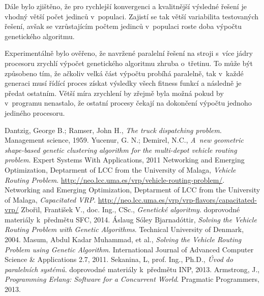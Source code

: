 \documentclass[a4paper]{article}
\begin{document}
Dále bylo zjištěno, že pro rychlejší konvergenci a kvalitnější výsledné řešení je vhodný větší počet jedinců v~populaci. Zajistí se tak větší variabilita testovaných řešení, avšak se vzrůstajícím počtem jedinců v~populaci roste doba výpočtu genetického algoritmu.

Experimentálně bylo ověřeno, že navržené paralelní řešení na stroji s~více jádry procesoru zrychlí výpočet genetického algoritmu zhruba o~třetinu. To může být způsobeno tím, že ačkoliv velká část výpočtu probíhá paralelně, tak v~každé generaci musí řídící proces získat výsledky všech fitness funkcí a následně je předat ostatním. Větší míra zrychlení by zřejmě byla možná pokud by v~programu nenastalo, že ostatní procesy čekají na dokončení výpočtu jednoho jediného procesoru.

\begin{thebibliography}{9}
Dantzig, George B.; Ramser, John H.,
\emph{The truck dispatching problem}.
Management science, 1959.
Yucenur, G. N.; Demirel, N.C.,
\emph{A~new geometric shape-based genetic clustering algorithm for the multi-depot vehicle routing problem}.
Expert Systems With Applications, 2011
Networking and Emerging Optimization, Deptarment of LCC from the University of Malaga,
\emph{Vehicle Routing Problem}.
\url{http://neo.lcc.uma.es/vrp/vehicle-routing-problem/}.
Networking and Emerging Optimization, Deptarment of LCC from the University of Malaga,
\emph{Capacitated VRP}.
\url{http://neo.lcc.uma.es/vrp/vrp-flavors/capacitated-vrp/}
Zbořil, František V., doc. Ing., CSc.,
\emph{Genetické algoritmy}.
doprovodné materiály k~předmětu SFC,
2014.
Áslaug Sóley Bjarnadóttir,
\emph{Solving the Vehicle Routing Problem with Genetic Algorithms}.
Technical University of Denmark,
2004.
Masum, Abdul Kadar Muhammad, et al.,
\emph{Solving the Vehicle Routing Problem using Genetic Algorithm}.
International Journal of Advanced Computer Science \& Applications 2.7,
2011.
Sekanina, L, prof. Ing., Ph.D.,
\emph{Úvod do paralelních systémů}.
doprovodné materiály k~předmětu INP,
2013.
Armstrong, J.,
\emph{Programming Erlang: Software for a Concurrent World}.
Pragmatic Programmers,
2013.
\end{thebibliography}
\end{document}
